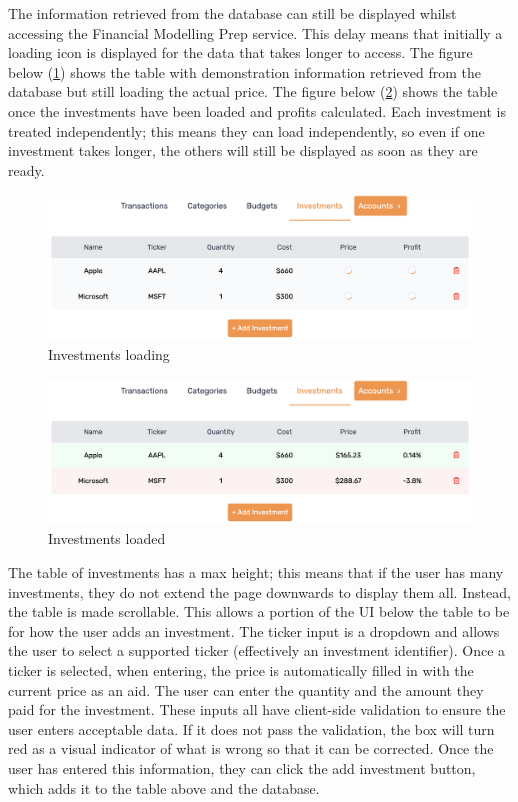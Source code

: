 The information retrieved from the database can still be displayed whilst accessing the Financial Modelling Prep service. This delay means that initially a loading icon is displayed for the data that takes longer to access. The figure below (\ref{fig:InvestmentsLoading}) shows the table with demonstration information retrieved from the database but still loading the actual price. The figure below (\ref{fig:InvestmentsLoaded}) shows the table once the investments have been loaded and profits calculated. Each investment is treated independently; this means they can load independently, so even if one investment takes longer, the others will still be displayed as soon as they are ready.

\begin{figure}[H]
	\centering
	\includegraphics[width=\textwidth]{images/Investments_loading.png}
	\caption{Investments loading}
	\label{fig:InvestmentsLoading}
\end{figure}

\begin{figure}[H]
	\centering
	\includegraphics[width=\textwidth]{images/Investments_loaded.png}
	\caption{Investments loaded}
	\label{fig:InvestmentsLoaded}
\end{figure}

The table of investments has a max height; this means that if the user has many investments, they do not extend the page downwards to display them all. Instead, the table is made scrollable. This allows a portion of the UI below the table to be for how the user adds an investment. The ticker input is a dropdown and allows the user to select a supported ticker (effectively an investment identifier). Once a ticker is selected, when entering, the price is automatically filled in with the current price as an aid. The user can enter the quantity and the amount they paid for the investment. These inputs all have client-side validation to ensure the user enters acceptable data. If it does not pass the validation, the box will turn red as a visual indicator of what is wrong so that it can be corrected. Once the user has entered this information, they can click the add investment button, which adds it to the table above and the database.

